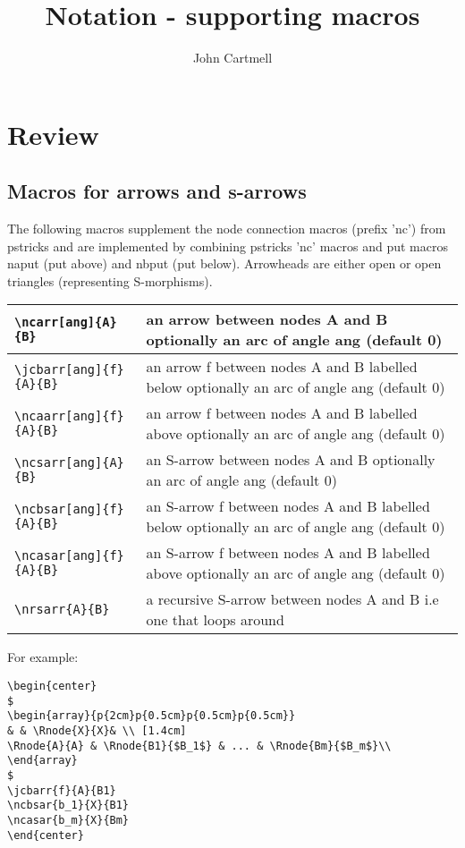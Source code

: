 \documentclass[10pt,a4paper]{article}
\title{Notation - supporting macros}
\author{John Cartmell}
\begin{document}
\maketitle
\section {Review }
\vspace{5mm}


\subsection {Macros for arrows and s-arrows}
The following macros supplement the node connection macros (prefix 'nc') from pstricks and are implemented by combining pstricks 'nc' macros and put macros naput (put above) and nbput (put below). Arrowheads are either open or open triangles (representing S-morphisms).
\begin{table}[h]
	\centering
		\begin{tabular}{|l |  p{5cm} | }
		   \hline	   
		   \verb!\ncarr[ang]{A}{B}! &  an arrow between nodes A and B optionally an arc of angle ang (default 0)\\
		   \hline
		 	 \verb!\jcbarr[ang]{f}{A}{B}! & an arrow f between nodes A and B labelled below optionally an arc of angle ang (default 0)\\
		 	 \hline
		 	 \verb!\ncaarr[ang]{f}{A}{B}! & an arrow f between nodes A and B labelled above optionally an arc of angle ang (default 0)\\
			\hline	   
		   \verb!\ncsarr[ang]{A}{B}! &  an S-arrow between nodes A and B optionally an arc of angle ang (default 0)\\
		 	 \hline			
		 	 \verb!\ncbsar[ang]{f}{A}{B}! & an S-arrow f between nodes A and B labelled below optionally an arc of angle ang (default 0)\\
		 	 \hline
		 	 \verb!\ncasar[ang]{f}{A}{B}! & an S-arrow f between nodes A and B labelled above optionally an arc of angle ang (default 0)\\
		 	 \hline	   
		   \verb!\nrsarr{A}{B}! &  a recursive S-arrow between nodes A and B i.e one that loops around\\ 
			\hline		
		\end{tabular}
\end{table}

\noindent For example:
\begin{verbatim}
\begin{center}
$
\begin{array}{p{2cm}p{0.5cm}p{0.5cm}p{0.5cm}}
& & \Rnode{X}{X}& \\ [1.4cm]
\Rnode{A}{A} & \Rnode{B1}{$B_1$} & ... & \Rnode{Bm}{$B_m$}\\
\end{array}
$
\jcbarr{f}{A}{B1}
\ncbsar{b_1}{X}{B1}
\ncasar{b_m}{X}{Bm}
\end{center}
\end{verbatim}
\end{document}
